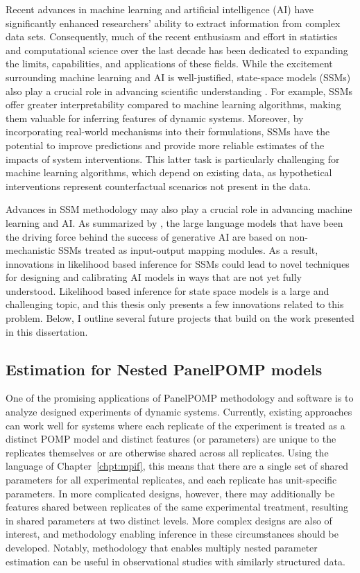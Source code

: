Recent advances in machine learning and artificial intelligence (AI) have significantly enhanced researchers' ability to extract information from complex data sets.
Consequently, much of the recent enthusiasm and effort in statistics and computational science over the last decade has been dedicated to expanding the limits, capabilities, and applications of these fields.
While the excitement surrounding machine learning and AI is well-justified, state-space models (SSMs) also play a crucial role in advancing scientific understanding \citep{baker18,hogg24}.
For example, SSMs offer greater interpretability compared to machine learning algorithms, making them valuable for inferring features of dynamic systems.
Moreover, by incorporating real-world mechanisms into their formulations, SSMs have the potential to improve predictions and provide more reliable estimates of the impacts of system interventions.
This latter task is particularly challenging for machine learning algorithms, which depend on existing data, as hypothetical interventions represent counterfactual scenarios not present in the data.

Advances in SSM methodology may also play a crucial role in advancing machine learning and AI.
As summarized by \citet{lin24}, the large language models that have been the driving force behind the success of generative AI are based on non-mechanistic SSMs treated as input-output mapping modules.
As a result, innovations in likelihood based inference for SSMs could lead to novel techniques for designing and calibrating AI models in ways that are not yet fully understood.
Likelihood based inference for state space models is a large and challenging topic, and this thesis only presents a few innovations related to this problem.
Below, I outline several future projects that build on the work presented in this dissertation.

\subsection*{Estimation for Nested PanelPOMP models}

One of the promising applications of PanelPOMP methodology and software is to analyze designed experiments of dynamic systems.
Currently, existing approaches can work well for systems where each replicate of the experiment is treated as a distinct POMP model and distinct features (or parameters) are unique to the replicates themselves or are otherwise shared across all replicates.
Using the language of Chapter~\ref{chpt:mpif}, this means that there are a single set of shared parameters for all experimental replicates, and each replicate has unit-specific parameters. 
In more complicated designs, however, there may additionally be features shared between replicates of the same experimental treatment, resulting in shared parameters at two distinct levels.
More complex designs are also of interest, and methodology enabling inference in these circumstances should be developed.
Notably, methodology that enables multiply nested parameter estimation can be useful in observational studies with similarly structured data. 

